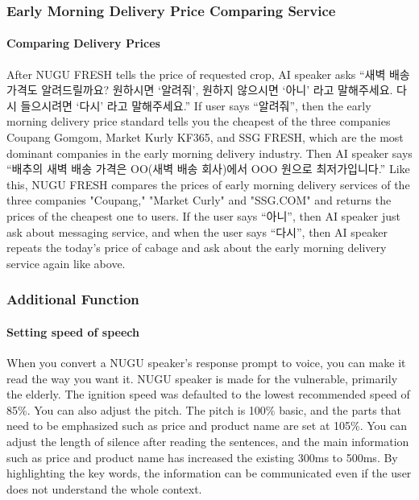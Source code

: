 \documentclass[conference]{IEEEtran}
\begin{document}
\subsubsection{Early Morning Delivery Price Comparing Service\\}
\paragraph{Comparing Delivery Prices}
After NUGU FRESH tells the price of requested crop, AI speaker asks “새벽 배송 가격도 알려드릴까요? 원하시면 ‘알려줘’, 원하지 않으시면 ‘아니’ 라고 말해주세요. 다시 들으시려면 ‘다시’ 라고 말해주세요.” If user says “알려줘”, then the early morning delivery price standard tells you the cheapest of the three companies Coupang Gomgom, Market Kurly KF365, and SSG FRESH, which are the most dominant companies in the early morning delivery industry. Then AI speaker says “배추의 새벽 배송 가격은 OO(새벽 배송 회사)에서 OOO 원으로 최저가입니다.” Like this, NUGU FRESH compares the prices of early morning delivery services of the three companies "Coupang," "Market Curly" and "SSG.COM" and returns the prices of the cheapest one to users. If the user says “아니”, then AI speaker just ask about messaging service, and when the user says “다시”, then AI speaker repeats the today’s price of cabage and ask about the early morning delivery service again like above. 

\subsubsection{Additional Function}
\paragraph{Setting speed of speech}
When you convert a NUGU speaker's response prompt to voice, you can make it read the way you want it. NUGU speaker is made for the vulnerable, primarily the elderly. The ignition speed was defaulted to the lowest recommended speed of 85\%. You can also adjust the pitch. The pitch is 100\% basic, and the parts that need to be emphasized such as price and product name are set at 105\%. You can adjust the length of silence after reading the sentences, and the main information such as price and product name has increased the existing 300ms to 500ms. By highlighting the key words, the information can be communicated even if the user does not understand the whole context.
\end{document}
